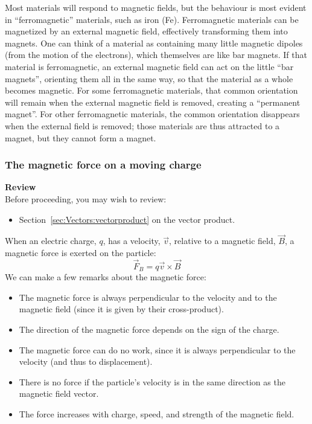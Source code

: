 Most materials will respond to magnetic fields, but the behaviour is most evident in ``ferromagnetic'' materials, such as iron (Fe). Ferromagnetic materials can be magnetized by an external magnetic field, effectively transforming them into magnets. One can think of a material as containing many little magnetic dipoles (from the motion of the electrons), which themselves are like bar magnets. If that material is ferromagnetic,  an external magnetic field can act on the little ``bar magnets'', orienting them all in the same way, so that the material as a whole becomes magnetic. For some ferromagnetic materials, that common orientation will remain when the external magnetic field is removed, creating a ``permanent magnet''. For other ferromagnetic materials, the common orientation disappears when the external field is removed; those materials are thus attracted to a magnet, but they cannot form a magnet.

\subsubsection{The magnetic force on a moving charge}

\begin{framed}
\textbf{Review}\\
Before proceeding, you may wish to review:

\begin{itemize}
\item Section~\ref{sec:Vectors:vectorproduct} on the vector product.
\end{itemize}
\end{framed}

When an electric charge, $q$, has a velocity, $\vec v$, relative to a magnetic field, $\vec B$, a magnetic force is exerted on the particle:
\begin{equation}
\boxed{\vec F_B = q \vec v \times \vec B}
\end{equation}
We can make a few remarks about the magnetic force:

\begin{itemize}
\item The magnetic force is always perpendicular to the velocity and to the magnetic field (since it is given by their cross-product).
\item The direction of the magnetic force depends on the sign of the charge.
\item The magnetic force can do no work, since it is always perpendicular to the velocity (and thus to displacement).
\item There is no force if the particle's velocity is in the same direction as the magnetic field vector.
\item The force increases with charge, speed, and strength of the magnetic field.
\end{itemize}

